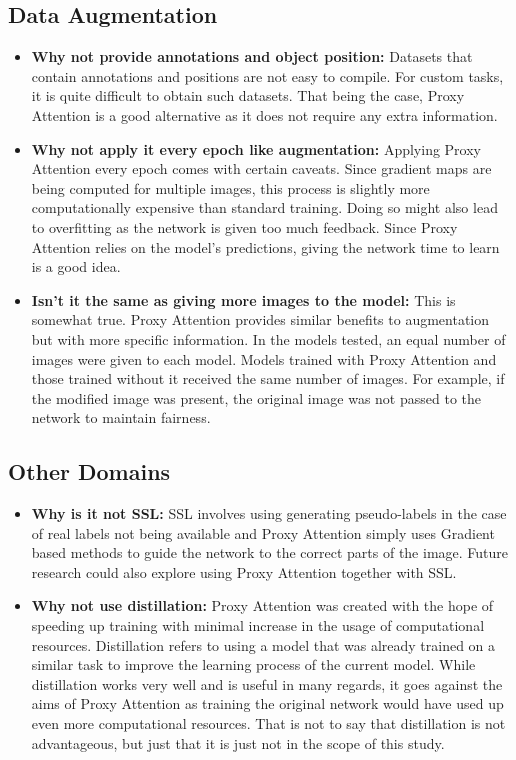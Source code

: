 \subsection{Data Augmentation}
\begin{itemize}
    \item \textbf{Why not provide annotations and object position: }Datasets that contain annotations and positions are not easy to compile. For custom tasks, it is quite difficult to obtain such datasets. That being the case, Proxy Attention is a good alternative as it does not require any extra information.

    \item \textbf{Why not apply it every epoch like augmentation: } Applying Proxy Attention every epoch comes with certain caveats. Since gradient maps are being computed for multiple images, this process is slightly more computationally expensive than standard training. Doing so might also lead to overfitting as the network is given too much feedback. Since Proxy Attention relies on the model's predictions, giving the network time to learn is a good idea.

    \item \textbf{Isn't it the same as giving more images to the model: } This is somewhat true. Proxy Attention provides similar benefits to augmentation but with more specific information. In the models tested, an equal number of images were given to each model. Models trained with Proxy Attention and those trained without it received the same number of images. For example, if the modified image was present, the original image was not passed to the network to maintain fairness.
\end{itemize}

\subsection{Other Domains}
\begin{itemize}
\item \textbf{Why is it not SSL:} SSL involves using generating pseudo-labels in the case of real labels not being available and Proxy Attention simply uses Gradient based methods to guide the network to the correct parts of the image. Future research could also explore using Proxy Attention together with SSL.
\item \textbf{Why not use distillation:} Proxy Attention was created with the hope of speeding up training with minimal increase in the usage of computational resources. Distillation refers to using a model that was already trained on a similar task to improve the learning process of the current model. While distillation works very well and is useful in many regards, it goes against the aims of Proxy Attention as training the original network would have used up even more computational resources. That is not to say that distillation is not advantageous, but just that it is just not in the scope of this study.
\end{itemize}

